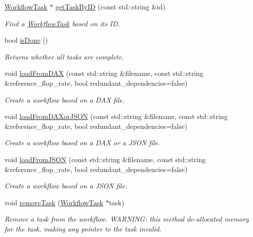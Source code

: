 \begin{DoxyCompactItemize}
\hyperlink{classwrench_1_1_workflow_task}{Workflow\+Task} $\ast$ \hyperlink{classwrench_1_1_workflow_a43d89af79196164d060115ee25200306}{get\+Task\+By\+ID} (const std\+::string \&id)
\begin{DoxyCompactList}\small\item\em Find a \hyperlink{classwrench_1_1_workflow_task}{Workflow\+Task} based on its ID. \end{DoxyCompactList}\item 
bool \hyperlink{classwrench_1_1_workflow_afc59b67119511acac649652d560f238a}{is\+Done} ()
\begin{DoxyCompactList}\small\item\em Returns whether all tasks are complete. \end{DoxyCompactList}\item 
void \hyperlink{classwrench_1_1_workflow_ac7048676d96d85a4f59580d4f77da935}{load\+From\+D\+AX} (const std\+::string \&filename, const std\+::string \&reference\+\_\+flop\+\_\+rate, bool redundant\+\_\+dependencies=false)
\begin{DoxyCompactList}\small\item\em Create a workflow based on a D\+AX file. \end{DoxyCompactList}\item 
void \hyperlink{classwrench_1_1_workflow_aac13e09401af73a566695502b559dda0}{load\+From\+D\+A\+Xor\+J\+S\+ON} (const std\+::string \&filename, const std\+::string \&reference\+\_\+flop\+\_\+rate, bool redundant\+\_\+dependencies=false)
\begin{DoxyCompactList}\small\item\em Create a workflow based on a D\+AX or a J\+S\+ON file. \end{DoxyCompactList}\item 
void \hyperlink{classwrench_1_1_workflow_aa0b24ef757bfaf6cffcd61256331a33d}{load\+From\+J\+S\+ON} (const std\+::string \&filename, const std\+::string \&reference\+\_\+flop\+\_\+rate, bool redundant\+\_\+dependencies=false)
\begin{DoxyCompactList}\small\item\em Create a workflow based on a J\+S\+ON file. \end{DoxyCompactList}\item 
void \hyperlink{classwrench_1_1_workflow_af2361b641261ea13079902bef91e11f4}{remove\+Task} (\hyperlink{classwrench_1_1_workflow_task}{Workflow\+Task} $\ast$task)
\begin{DoxyCompactList}\small\item\em Remove a task from the workflow. W\+A\+R\+N\+I\+NG\+: this method de-\/allocated memory for the task, making any pointer to the task invalid. \end{DoxyCompactList}\end{DoxyCompactItemize}
